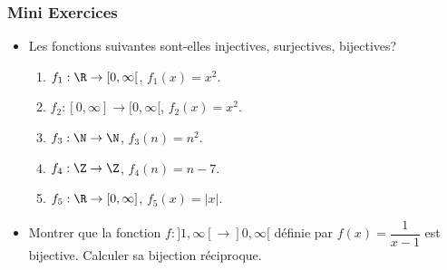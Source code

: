   \begin{frame}[t]
    \frametitle{Mini Exercices}
    \begin{itemize}
      \item Les fonctions suivantes sont-elles injectives, surjectives,
        bijectives?

        \begin{enumerate}
          \item $f_1: \R\rightarrow [0,\infty[$, $f_1(x)=x^2$.\\[6pt]
          \item $f_2: [0,\infty]\rightarrow [0,\infty[$, $f_2(x)=x^2$.\\[6pt]
          \item $f_3: \N\rightarrow \N$, $f_3(n)=n^2$.\\[6pt]
          \item $f_4: \Z\rightarrow \Z$, $f_4(n)=n-7$.\\[6pt]
          \item $f_5: \R\rightarrow [0,\infty]$, $f_5(x)=\vert x\vert$.\\[6pt]
        \end{enumerate}
      \item Montrer que la fonction $f:]1,\infty[ \rightarrow ]0,\infty[$
        définie par $f(x)= \dfrac{1}{x-1}$ est bijective. Calculer sa bijection
        réciproque.
    \end{itemize} 
  \end{frame}
